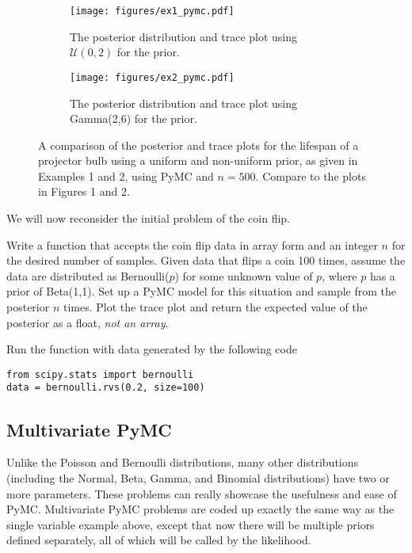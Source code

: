 \begin{figure}[H]
\centering

\begin{subfigure}{\textwidth}
    \centering
    \texttt{[image: figures/ex1\_pymc.pdf]}
    \caption{The posterior distribution and trace plot using $\mathcal{U}(0,2)$ for the prior.}
\end{subfigure}

\begin{subfigure}{\textwidth}
    \centering
    \texttt{[image: figures/ex2\_pymc.pdf]}
    \caption{The posterior distribution and trace plot using Gamma(2,6) for the prior.}
\end{subfigure}

\caption{A comparison of the posterior and trace plots for the lifespan of a projector bulb using a uniform and non-uniform prior, as given in Examples 1 and 2, using PyMC and $n=500$.
Compare to the plots in Figures 1 and 2.}
\end{figure}

We will now reconsider the initial problem of the coin flip.

\begin{problem}
Write a function that accepts the coin flip data in array form and an integer $n$ for the desired number of samples.
Given data that flips a coin 100 times, assume the data are distributed as Bernoulli($p$) for some unknown value of $p$, where $p$ has a prior of Beta(1,1).
Set up a PyMC model for this situation and sample from the posterior $n$ times.
Plot the trace plot and return the expected value of the posterior as a float, \emph{not an array}.

Run the function with data generated by the following code
\begin{lstlisting}
from scipy.stats import bernoulli
data = bernoulli.rvs(0.2, size=100)
\end{lstlisting}
\end{problem}

\subsection*{Multivariate PyMC}
Unlike the Poisson and Bernoulli distributions, many other distributions (including the Normal, Beta, Gamma, and Binomial distributions) have two or more parameters.
These problems can really showcase the usefulness and ease of PyMC.
Multivariate PyMC problems are coded up exactly the same way as the single variable example above, except that now there will be multiple priors defined separately, all of which will be called by the likelihood.


